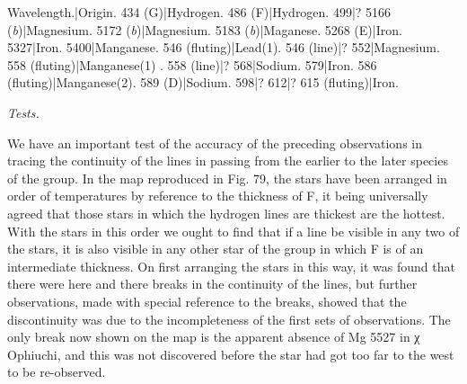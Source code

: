 \documentclass[a4paper, 12pt, oneside, polutonikogreek, english]{article}
\begin{document}
Wavelength.|Origin. 
434 (G)|Hydrogen. 
486 (F)|Hydrogen. 
499|? 
5166 (\emph{b})|Magnesium. 
5172 (\emph{b})|Magnesium. 
5183 (\emph{b})|Maganese. 
5268 (E)|Iron. 
5327|Iron. 
5400|Manganese. 
546 (fluting)|Lead(1). 
546 (line)|? 
552|Magnesium. 
558 (fluting)|Manganese(1) . 
558 (line)|? 
568|Sodium. 
579|Iron. 
586 (fluting)|Manganese(2). 
589 (D)|Sodium. 
598|? 
612|? 
615 (fluting)|Iron. 

\emph{Tests.}

We have an important test of the accuracy of the preceding observations in tracing the continuity of the lines in passing from the earlier to the later species of the group. In the map reproduced in Fig. 79, the stars have been arranged in order of temperatures by reference to the thickness of F, it being universally agreed that those stars in which the hydrogen lines are thickest are the hottest. With the stars in this order we ought to find that if a line be visible in any two of the stars, it is also visible in any other star of the group in which F is of an intermediate thickness. On first arranging the stars in this way, it was found that there were here and there breaks in the continuity of the lines, but further observations, made with special reference to the breaks, showed that the discontinuity was due to the incompleteness of the first sets of observations. The only break now shown on the map is the apparent absence of Mg 5527 in χ Ophiuchi, and this was not discovered before the star had got too far to the west to be re-observed.
\end{document}
